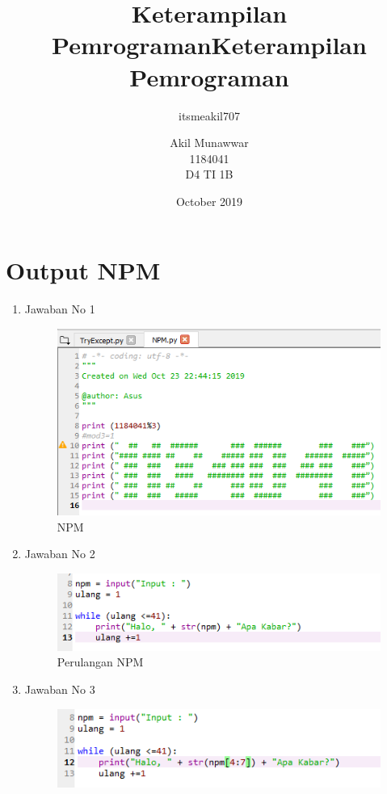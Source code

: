 \documentclass{article}
\title{Keterampilan Pemrograman}
\author{itsmeakil707 }
\date{October 2019}
\begin{document}
\title{Keterampilan Pemrograman}
\author{Akil Munawwar \\ 1184041 \\ D4 TI 1B }
\maketitle

\section{Output NPM}
\begin{enumerate}
    \item Jawaban No 1
    \begin{figure}[!htbp]
        \centering
        \includegraphics[scale=0.8]{NPM.PNG}
        \caption{NPM}
    \end{figure}
    \item Jawaban No 2
    \begin{figure}[!htbp]
        \centering
        \includegraphics[scale=0.8]{PerulanganNPM.PNG}
        \caption{Perulangan NPM}
    \end{figure}
    \newpage
    \item Jawaban No 3
    \begin{figure}[!htbp]
        \centering
        \includegraphics{PerulanganNPM2.PNG}

\end{figure}
\end{enumerate}
\end{document}
